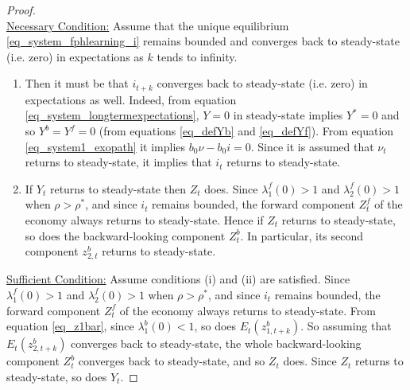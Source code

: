 \begin{proof}~\\
\underline{Necessary Condition:} Assume that the unique equilibrium \eqref{eq_system_fphlearning_i} remains bounded and converges back to steady-state (i.e. zero) in expectations as $k$ tends to infinity.
\begin{enumerate}[label=(\roman*)]
   \item Then it must be that $i_{t+k}$ converges back to steady-state (i.e. zero) in expectations as well. Indeed, from equation \eqref{eq_system_longtermexpectations}, $Y=0$ in steady-state implies $Y^*=0$ and so $Y^b=Y^f=0$ (from equations \eqref{eq_defYb} and \eqref{eq_defYf}). From equation \eqref{eq_system1_exopath} it implies $b_0 \nu - b_0 i =0$. Since it is assumed that $\nu_t$ returns to steady-state, it implies that $i_t$ returns to steady-state.
\item If $Y_t$ returns to steady-state then $Z_t$ does. Since $\lambda^f_1(0)>1$ and $\lambda^f_2(0)>1$ when $\rho>\rho^*$, and since $i_t$ remains bounded, the forward component $Z_t^f$ of the economy always returns to steady-state. Hence if $Z_t$ returns to steady-state, so does the backward-looking component $Z_t^b$. In particular, its second component $z^b_{2,t}$ returns to steady-state.
\end{enumerate}
\underline{Sufficient Condition:} Assume conditions (i) and (ii) are satisfied.  Since $\lambda^f_1(0)>1$ and $\lambda^f_2(0)>1$ when $\rho>\rho^*$, and since $i_t$ remains bounded, the forward component $Z_t^f$ of the economy always returns to steady-state. From equation \eqref{eq_z1bar}, since $\lambda_1^b(0)<1$, so does $E_t(z^b_{1,t+k})$. So assuming that $E_t(z^b_{2,t+k})$ converges back to steady-state, the whole backward-looking component $Z^b_t$ converges back to steady-state, and so $Z_t$ does. Since $Z_t$ returns to steady-state, so does $Y_t$.
\end{proof}

